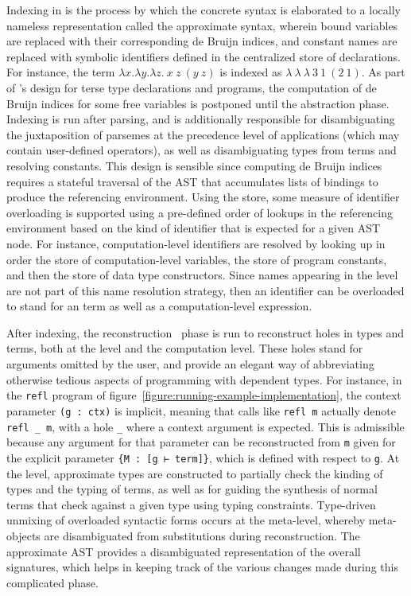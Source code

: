 Indexing in \Beluga is the process by which the concrete syntax is elaborated to a locally nameless representation called the approximate syntax, wherein bound variables are replaced with their corresponding de Bruijn indices, and constant names are replaced with symbolic identifiers defined in the centralized store of declarations.
For instance, the \LF term $\lambda x. \lambda y. \lambda z.\ x\ z\ (y\ z)$ is indexed as $\lambda\ \lambda\ \lambda\ 3\ 1\ (2\ 1)$.
As part of \Beluga's design for terse type declarations and programs, the computation of de Bruijn indices for some free variables is postponed until the abstraction phase.
Indexing is run after parsing, and is additionally responsible for disambiguating the juxtaposition of \LF parsemes at the precedence level of applications (which may contain user-defined operators), as well as disambiguating \LF types from terms and resolving constants.
This design is sensible since computing de Bruijn indices requires a stateful traversal of the \ac{AST} that accumulates lists of bindings to produce the referencing environment.
Using the store, some measure of identifier overloading is supported using a pre-defined order of lookups in the referencing environment based on the kind of identifier that is expected for a given \ac{AST} node.
For instance, computation-level identifiers are resolved by looking up in order the store of computation-level variables, the store of program constants, and then the store of data type constructors.
Since names appearing in the \LF level are not part of this name resolution strategy, then an identifier can be overloaded to stand for an \LF term as well as a computation-level expression.

After indexing, the reconstruction~\cite{pientka2013insider} phase is run to reconstruct holes in types and terms, both at the \LF level and the computation level.
These holes stand for arguments omitted by the user, and provide an elegant way of abbreviating otherwise tedious aspects of programming with dependent types.
For instance, in the \verb|refl| program of figure~\ref{figure:running-example-implementation}, the context parameter \verb|(g : ctx)| is implicit, meaning that calls like \verb|refl m| actually denote \verb|refl _ m|, with a hole \verb|_| where a context argument is expected.
This is admissible because any argument for that parameter can be reconstructed from \verb|m| given for the explicit parameter \verb|{M : [g ⊢ term]}|, which is defined with respect to \verb|g|.
At the \LF level, approximate types are constructed to partially check the kinding of \LF types and the typing of \LF terms, as well as for guiding the synthesis of normal terms that check against a given type using typing constraints.
Type-driven unmixing of overloaded syntactic forms occurs at the meta-level, whereby meta-objects are disambiguated from substitutions during reconstruction.
The approximate \ac{AST} provides a disambiguated representation of the overall \Beluga signatures, which helps in keeping track of the various changes made during this complicated phase.

